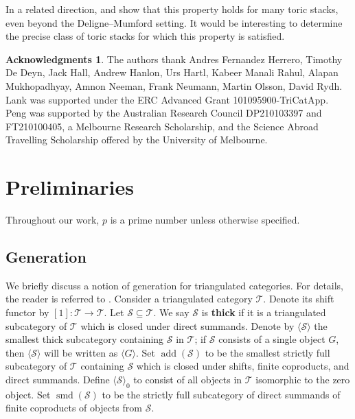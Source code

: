 \documentclass[11pt]{amsart}
\theoremstyle{plain}
\theoremstyle{definition}
\newtheorem*{ack}{Acknowledgments}
\numberwithin{equation}{section}
\numberwithin{theorem}{section}
\begin{document}
In a related direction, \cite{Hanlon/Hicks/Lazarev:2024} and \cite{Favero/Huang:2023} show that this property holds for many toric stacks, even beyond the Deligne--Mumford setting. 
It would be interesting to determine the precise class of toric stacks for which this property is satisfied.

\begin{ack}
    The authors thank Andres Fernandez Herrero, Timothy De Deyn, Jack Hall, Andrew Hanlon, Urs Hartl, Kabeer Manali Rahul, Alapan Mukhopadhyay, Amnon Neeman, Frank Neumann, Martin Olsson, David Rydh. 
    Lank was supported under the ERC Advanced Grant 101095900-TriCatApp.
    Peng was supported by the Australian Research Council DP210103397 and FT210100405, a Melbourne Research Scholarship, and the Science Abroad Travelling Scholarship offered by the University of Melbourne.
\end{ack}

\section{Preliminaries}
\label{sec:prelim}

Throughout our work, $p$ is a prime number unless otherwise specified.

\subsection{Generation}
\label{sec:prelim_generation}

We briefly discuss a notion of generation for triangulated categories. For details, the reader is referred to \cite{Bondal/VandenBergh:2003}. Consider a triangulated category $\mathcal{T}$. 
Denote its shift functor by $[1]\colon \mathcal{T} \to \mathcal{T}$. Let $\mathcal{S}\subseteq \mathcal{T}$. 
We say $\mathcal{S}$ is \textbf{thick} if it is a triangulated subcategory of $\mathcal{T}$ which is closed under direct summands. 
Denote by $\langle \mathcal{S} \rangle$ the smallest thick subcategory containing $\mathcal{S}$ in $\mathcal{T}$; if $\mathcal{S}$ consists of a single object $G$, then $\langle \mathcal{S}\rangle$ will be written as $\langle G\rangle$. 
Set $\operatorname{add}(\mathcal{S})$ to be the smallest strictly full subcategory of $\mathcal{T}$ containing $\mathcal{S}$ which is closed under shifts, finite coproducts, and direct summands. 
Define $\langle \mathcal{S} \rangle_0$ to consist of all objects in $\mathcal{T}$ isomorphic to the zero object. 
Set $\operatorname{smd}(\mathcal{S})$ to be the strictly full subcategory of direct summands of finite coproducts of objects from $\mathcal{S}$. 
\end{document}
